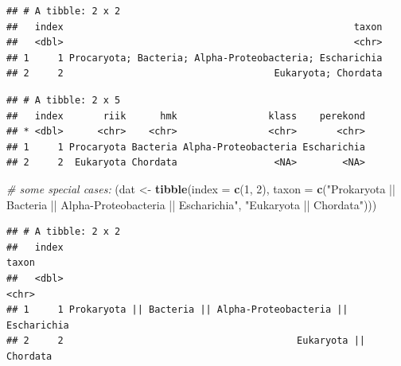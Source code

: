 \documentclass[]{book}
\newenvironment{Shaded}{\begin{snugshade}}{\end{snugshade}}
\newcommand{\KeywordTok}[1]{\textcolor[rgb]{0.13,0.29,0.53}{\textbf{#1}}}
\newcommand{\DataTypeTok}[1]{\textcolor[rgb]{0.13,0.29,0.53}{#1}}
\newcommand{\DecValTok}[1]{\textcolor[rgb]{0.00,0.00,0.81}{#1}}
\newcommand{\StringTok}[1]{\textcolor[rgb]{0.31,0.60,0.02}{#1}}
\newcommand{\CommentTok}[1]{\textcolor[rgb]{0.56,0.35,0.01}{\textit{#1}}}
\newcommand{\OperatorTok}[1]{\textcolor[rgb]{0.81,0.36,0.00}{\textbf{#1}}}
\newcommand{\NormalTok}[1]{#1}
\begin{document}
\begin{verbatim}
## # A tibble: 2 x 2
##   index                                                   taxon
##   <dbl>                                                   <chr>
## 1     1 Procaryota; Bacteria; Alpha-Proteobacteria; Escharichia
## 2     2                                     Eukaryota; Chordata
\end{verbatim}

\begin{Shaded}
\end{Shaded}

\begin{verbatim}
## # A tibble: 2 x 5
##   index       riik      hmk                klass    perekond
## * <dbl>      <chr>    <chr>                <chr>       <chr>
## 1     1 Procaryota Bacteria Alpha-Proteobacteria Escharichia
## 2     2  Eukaryota Chordata                 <NA>        <NA>
\end{verbatim}

\begin{Shaded}
\begin{Highlighting}[]
\CommentTok{# some special cases:}
\NormalTok{(dat <-}\StringTok{ }\KeywordTok{tibble}\NormalTok{(}\DataTypeTok{index =} \KeywordTok{c}\NormalTok{(}\DecValTok{1}\NormalTok{, }\DecValTok{2}\NormalTok{), }
               \DataTypeTok{taxon =} \KeywordTok{c}\NormalTok{(}\StringTok{"Prokaryota || Bacteria || Alpha-Proteobacteria || Escharichia"}\NormalTok{, }\StringTok{"Eukaryota || Chordata"}\NormalTok{)))}
\end{Highlighting}
\end{Shaded}

\begin{verbatim}
## # A tibble: 2 x 2
##   index                                                         taxon
##   <dbl>                                                         <chr>
## 1     1 Prokaryota || Bacteria || Alpha-Proteobacteria || Escharichia
## 2     2                                         Eukaryota || Chordata
\end{verbatim}
\end{document}
